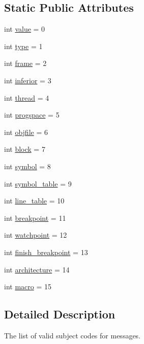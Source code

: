 \subsection*{Static Public Attributes}
\begin{DoxyCompactItemize}
\item 
int \hyperlink{classmessage_1_1Subject_afbe000d791d41953a866b13c8e75c356}{value} = 0
\item 
int \hyperlink{classmessage_1_1Subject_a2513fde3e08a61b0b5c12a94181394ac}{type} = 1
\item 
int \hyperlink{classmessage_1_1Subject_a5e06e236446b0943bb19b883d044f9ac}{frame} = 2
\item 
int \hyperlink{classmessage_1_1Subject_a366864ab5242b7b1ecf9a161b28b9123}{inferior} = 3
\item 
int \hyperlink{classmessage_1_1Subject_a015050d4a3a3e25a73d64ab2061fedbb}{thread} = 4
\item 
int \hyperlink{classmessage_1_1Subject_afabf025ccc3a7f72fab7c696e4c79ea7}{progspace} = 5
\item 
int \hyperlink{classmessage_1_1Subject_a113b165e9721b6bd3c2b60136e11e751}{objfile} = 6
\item 
int \hyperlink{classmessage_1_1Subject_a157cafe1e7a72efff6dfd0bcaabcdd07}{block} = 7
\item 
int \hyperlink{classmessage_1_1Subject_a4ce703784a4ff01e5a5c22bbcbc0cfbe}{symbol} = 8
\item 
int \hyperlink{classmessage_1_1Subject_a948474a595d3751ff94e13e23294530f}{symbol\+\_\+table} = 9
\item 
int \hyperlink{classmessage_1_1Subject_a6481cfa1d47bc183dbfa9a0391ca1850}{line\+\_\+table} = 10
\item 
int \hyperlink{classmessage_1_1Subject_a543f47987131625bd78e9eae567fe6c3}{breakpoint} = 11
\item 
int \hyperlink{classmessage_1_1Subject_a7f5bac729d1eeb47d2c9722783efa32b}{watchpoint} = 12
\item 
int \hyperlink{classmessage_1_1Subject_a3454782f27adb0f5a3a9cb2862b089b8}{finish\+\_\+breakpoint} = 13
\item 
int \hyperlink{classmessage_1_1Subject_a35928e11a365c303fb9f04d6aa028189}{architecture} = 14
\item 
int \hyperlink{classmessage_1_1Subject_abfddf4717207310a57097489b4c56ef7}{macro} = 15
\end{DoxyCompactItemize}


\subsection{Detailed Description}
\begin{DoxyVerb}The list of valid subject codes for messages.
\end{DoxyVerb}
 

